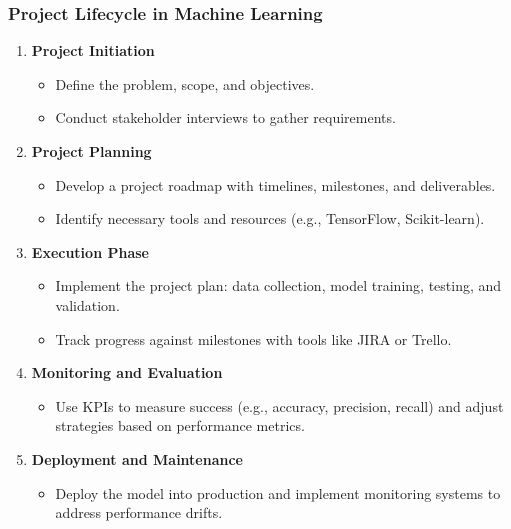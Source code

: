 \documentclass[aspectratio=169]{beamer}
\begin{document}
\begin{frame}[fragile]
    \frametitle{Project Lifecycle in Machine Learning}
    \begin{enumerate}
        \item \textbf{Project Initiation}
        \begin{itemize}
            \item Define the problem, scope, and objectives.
            \item Conduct stakeholder interviews to gather requirements.
        \end{itemize}

        \item \textbf{Project Planning}
        \begin{itemize}
            \item Develop a project roadmap with timelines, milestones, and deliverables.
            \item Identify necessary tools and resources (e.g., TensorFlow, Scikit-learn).
        \end{itemize}

        \item \textbf{Execution Phase}
        \begin{itemize}
            \item Implement the project plan: data collection, model training, testing, and validation.
            \item Track progress against milestones with tools like JIRA or Trello.
        \end{itemize}

        \item \textbf{Monitoring and Evaluation}
        \begin{itemize}
            \item Use KPIs to measure success (e.g., accuracy, precision, recall) and adjust strategies based on performance metrics.
        \end{itemize}

        \item \textbf{Deployment and Maintenance}
        \begin{itemize}
            \item Deploy the model into production and implement monitoring systems to address performance drifts.
        \end{itemize}
    \end{enumerate}
\end{frame}
\end{document}
